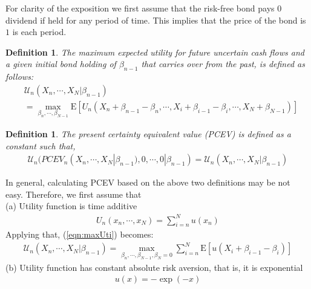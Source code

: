 \documentclass{article}[12pt letter]
\newtheorem{definition}[theorem]{Definition}
\newcommand{\E}{\mathrm{E}}
\begin{document}


For clarity of the exposition we first assume that the risk-free bond pays $0$ dividend if held for any period of time. This implies that the price of the bond is $1$ is each period.

\begin{definition} The maximum expected utility for future uncertain cash flows and a given initial bond holding of $\beta_{n-1}$ that carries over from the past, is defined as follows:
\begin{align} \label{eqn:maxUti}
    &\mathcal{U}_n(X_n,\cdots, X_{N}|\beta_{n-1}) \nonumber \\
    & = \max_{\beta_n, \cdots, \beta_{N-1}} \E [U_n(X_n+\beta_{n-1}-\beta_n, \cdots, X_i + \beta_{i-1}-\beta_i, \cdots, X_N + \beta_{N-1}) ]
\end{align}
\end{definition}

\begin{definition} The present certainty equivalent value (PCEV) is defined as a constant such that,
\begin{align} \label{eqn:PCEV}
    \mathcal{U}_n(PCEV_n(X_n, \cdots, X_N|\beta_{n-1}), 0,\cdots,0|\beta_{n-1})=\mathcal{U}_n(X_n,\cdots, X_{N}|\beta_{n-1})
\end{align}
\end{definition}
In general, calculating PCEV based on the above two definitions may be not easy. Therefore, we first assume that  \\
(a) Utility function is time additive
\begin{align}\label{eqn:addUti}
 U_n(x_n, \cdots, x_{N}) = \sum_{i = n}^Nu(x_n)
\end{align}
Applying that,  (\ref{eqn:maxUti}) becomes:
\begin{align} \label{eqn:maxAddUti}
    \mathcal{U}_n(X_n,\cdots, X_{N}|\beta_{n-1}) = \max_{\beta_n, \cdots, \beta_{N-1},\beta_N = 0} \sum_{i=n}^N  \E [ u( X_i + \beta_{i-1}-\beta_i)]
\end{align}
(b) Utility function has constant absolute risk aversion, that is, it is exponential
\begin{align}\label{eqn:expUti}
u(x) = -\exp(-x)\end{align}
\end{document}
